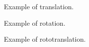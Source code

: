 {\begin{solution}
    \begin{marginfigure}
        \begin{center}
        \end{center}
        \caption{Example of translation.}
    \end{marginfigure}

    \begin{marginfigure}
        \begin{center}
        \end{center}
        \caption{Example of rotation.}
    \end{marginfigure}

    \begin{marginfigure}
        \begin{center}
        \end{center}
        \caption{Example of rototranslation.}
    \end{marginfigure}


\end{solution}}
